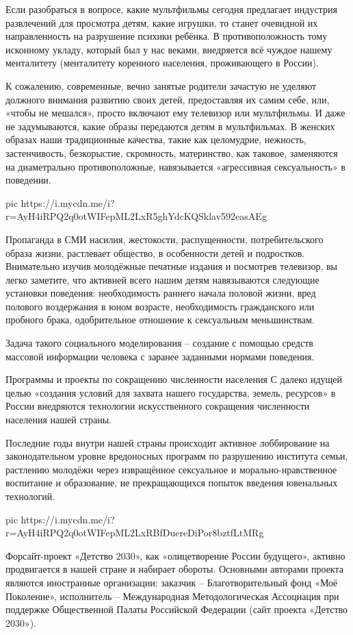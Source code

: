 Если разобраться в вопросе, какие мультфильмы сегодня предлагает индустрия
развлечений для просмотра детям, какие игрушки, то станет очевидной их
направленность на разрушение психики ребёнка. В противоположность тому
исконному укладу, который был у нас веками, внедряется всё чуждое нашему
менталитету (менталитету коренного населения, проживающего в России). 

К сожалению, современные, вечно занятые родители зачастую не уделяют должного
внимания развитию своих детей, предоставляя их самим себе, или, «чтобы не
мешался», просто включают ему телевизор или мультфильмы. И даже не
задумываются, какие образы передаются детям в мультфильмах. В женских образах
наши традиционные качества, такие как целомудрие, нежность, застенчивость,
безкорыстие, скромность, материнство, как таковое, заменяются на диаметрально
противоположные, навязывается «агрессивная сексуальность» в поведении.

\ifcmt
pic https://i.mycdn.me/i?r=AyH4iRPQ2q0otWIFepML2LxR5ghYdcKQSklav592easAEg
\fi

Пропаганда в СМИ насилия, жестокости, распущенности, потребительского образа
жизни, растлевает общество, в особенности детей и подростков. Внимательно
изучив молодёжные печатные издания и посмотрев телевизор, вы легко заметите,
что активней всего нашим детям навязываются следующие установки поведения:
необходимость раннего начала половой жизни, вред полового воздержания в юном
возрасте, необходимость гражданского или пробного брака, одобрительное
отношение к сексуальным меньшинствам. 

Задача такого социального моделирования –
создание с помощью средств массовой информации человека с заранее заданными
нормами поведения. 

Программы и проекты по сокращению численности населения С
далеко идущей целью «создания условий для захвата нашего государства, земель,
ресурсов» в России внедряются технологии искусственного сокращения численности
населения нашей страны. 

Последние годы внутри нашей страны происходит активное
лоббирование на законодательном уровне вредоносных программ по разрушению
института семьи, растлению молодёжи через извращённое сексуальное и
морально-нравственное воспитание и образование, не прекращающихся попыток
введения ювенальных технологий.

\ifcmt
pic https://i.mycdn.me/i?r=AyH4iRPQ2q0otWIFepML2LxRBfDuereDiPor8bztfLtMRg
\fi

Форсайт-проект «Детство 2030», как «олицетворение России будущего», активно
продвигается в нашей стране и набирает обороты. Основными авторами проекта
являются иностранные организации: заказчик – Благотворительный фонд «Моё
Поколение», исполнитель – Международная Методологическая Ассоциация при
поддержке Общественной Палаты Российской Федерации (сайт проекта «Детство
2030»).

